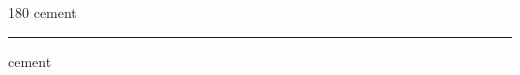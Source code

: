 
\begin{frame}
\begin{center}
\begin{turn}{180}
{\fontsize{2.5cm}{1em}\selectfont cement}
\end{turn}
\vspace{1em}\par  
\hrule
\vspace{1em}\par  
{\fontsize{2.5cm}{1em}\selectfont cement}
\end{center}
\end{frame}
